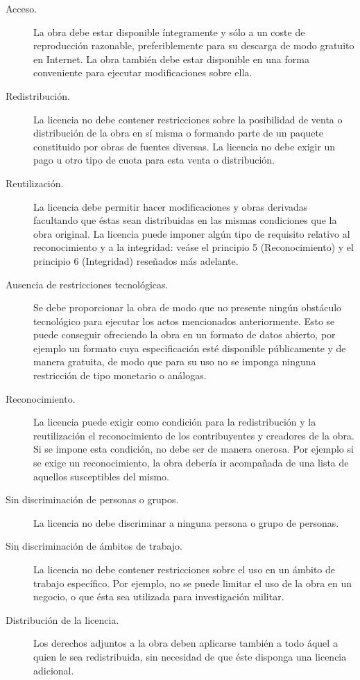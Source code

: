 \begin{description}
 \item [Acceso.] La obra debe estar disponible íntegramente y sólo a un coste de 
  reproducción razonable, preferiblemente para su descarga de modo gratuito en Internet. 
  La obra también debe estar disponible en una forma conveniente para ejecutar modificaciones sobre ella.
 \item [Redistribución.] La licencia no debe contener restricciones sobre la posibilidad de venta o 
  distribución de la obra en sí misma o formando parte de un paquete constituido por obras de fuentes diversas. 
  La licencia no debe exigir un pago u otro tipo de cuota para esta venta o distribución.
 \item [Reutilización.] La licencia debe permitir hacer modificaciones y obras derivadas facultando que éstas sean distribuidas en las mismas condiciones que la obra original. La licencia puede imponer algún tipo de requisito relativo al 
  reconocimiento y a la integridad: veáse el principio 5 (Reconocimiento) y el principio 6 (Integridad) reseñados más adelante.
 \item [Ausencia de restricciones tecnológicas.] Se debe proporcionar la obra de modo que no presente ningún obstáculo tecnológico para ejecutar los actos mencionados anteriormente. Esto se puede conseguir ofreciendo la obra en un formato de datos abierto, por ejemplo un formato cuya especificación esté disponible públicamente y de manera gratuita, de modo que para su uso no se imponga ninguna restricción de tipo monetario o análogas.
 \item [Reconocimiento.] La licencia puede exigir como condición para la redistribución y la reutilización el reconocimiento de los contribuyentes y creadores de la obra. Si se impone esta condición, no debe ser de manera onerosa. Por ejemplo si se exige un reconocimiento, la obra debería ir acompañada de una lista de aquellos susceptibles del mismo.
 \item [Sin discriminación de personas o grupos.] La licencia no debe discriminar a ninguna persona o grupo de personas.
 \item [Sin discriminación de ámbitos de trabajo.] La licencia no debe contener restricciones sobre el uso en un ámbito de trabajo específico. Por ejemplo, no se puede limitar el uso de la obra en un negocio, o que ésta sea utilizada para investigación militar.
 \item [Distribución de la licencia.] Los derechos adjuntos a la obra deben aplicarse también a todo áquel a quien le sea redistribuida, sin necesidad de que éste disponga una licencia adicional.

\end{description}
